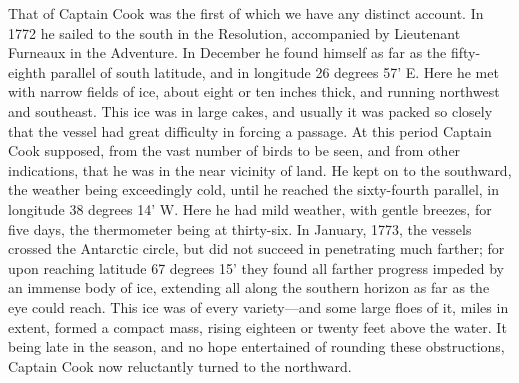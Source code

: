 That of Captain Cook was the first of which we have any distinct account. In
1772 he sailed to the south in the Resolution, accompanied by Lieutenant
Furneaux in the Adventure. In December he found himself as far as the
fifty-eighth parallel of south latitude, and in longitude 26 degrees 57' E. Here
he met with narrow fields of ice, about eight or ten inches thick, and running
northwest and southeast. This ice was in large cakes, and usually it was packed
so closely that the vessel had great difficulty in forcing a passage. At this
period Captain Cook supposed, from the vast number of birds to be seen, and from
other indications, that he was in the near vicinity of land. He kept on to the
southward, the weather being exceedingly cold, until he reached the sixty-fourth
parallel, in longitude 38 degrees 14' W. Here he had mild weather, with gentle
breezes, for five days, the thermometer being at thirty-six. In January, 1773,
the vessels crossed the Antarctic circle, but did not succeed in penetrating
much farther; for upon reaching latitude 67 degrees 15' they found all farther
progress impeded by an immense body of ice, extending all along the southern
horizon as far as the eye could reach. This ice was of every variety---and some
large floes of it, miles in extent, formed a compact mass, rising eighteen or
twenty feet above the water. It being late in the season, and no hope
entertained of rounding these obstructions, Captain Cook now reluctantly turned
to the northward. 

